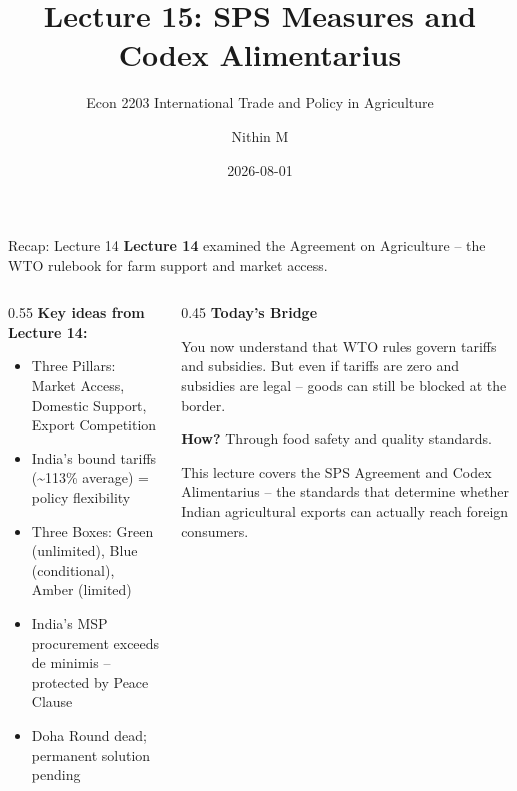 \documentclass[
  ignorenonframetext,
  aspectratio=169,
]{beamer}
\title[L15 \textbar{} SPS \& Codex]{Lecture 15: SPS Measures and Codex
Alimentarius}
\subtitle{Econ 2203 \textbar{} International Trade and Policy in
Agriculture}
\author{Nithin M}
\date{2026-08-01}
\institute{Department of Development Economics}
\makeatletter
\providecommand{\tightlist}{%
  \setlength{\itemsep}{0pt}\setlength{\parskip}{0pt}}
\let\quarto@originallabel\label
\DeclareRobustCommand*{\label}[1]{\quarto@originallabel{#1}}
\makeatother
\begin{document}
\frame{\titlepage}


\begin{frame}{Recap: Lecture 14}
\label{recap-lecture-14}
\textbf{Lecture 14} examined the Agreement on Agriculture -- the WTO
rulebook for farm support and market access.

\begin{columns}[T]
\begin{column}{0.55\linewidth}
\textbf{Key ideas from Lecture 14:}

\begin{itemize}
\tightlist
\item
  Three Pillars: Market Access, Domestic Support, Export Competition
\item
  India's bound tariffs (\textasciitilde113\% average) = policy
  flexibility
\item
  Three Boxes: Green (unlimited), Blue (conditional), Amber (limited)
\item
  India's MSP procurement exceeds de minimis -- protected by Peace
  Clause
\item
  Doha Round dead; permanent solution pending
\end{itemize}
\end{column}

\begin{column}{0.45\linewidth}
\textbf{Today's Bridge}

You now understand that WTO rules govern tariffs and subsidies. But even
if tariffs are zero and subsidies are legal -- goods can still be
blocked at the border.

\textbf{How?} Through food safety and quality standards.

This lecture covers the SPS Agreement and Codex Alimentarius -- the
standards that determine whether Indian agricultural exports can
actually reach foreign consumers.
\end{column}
\end{columns}
\end{frame}
\end{document}
